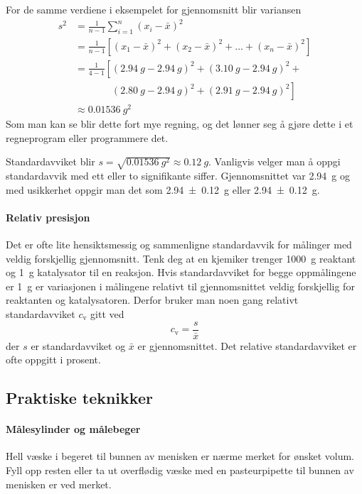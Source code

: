 \documentclass[hidelinks,12pt,norsk,a4paper,fleqn]{scrartcl}
\begin{document}
	
	For de samme verdiene i eksempelet for gjennomsnitt blir variansen
	\begin{align*}
		s^2 &= \frac{1}{n-1}\sum_{i=1}^{n}(x_i - \bar{x})^2 \\
		&=\frac{1}{n-1}\left[(x_1-\bar{x})^2 + (x_2-\bar{x})^2 + \dots + (x_n-\bar{x})^2\right]\\
		&=\frac{1}{4-1}\left[(\SI{2.94}{g}-\SI{2.94}{g})^2 + ( \SI{3.10}{g}-\SI{2.94}{g})^2\right. + \\
		&\phantom{=\frac{1}{4-1}\left[\right.}\left.  (\SI{2.80}{g}-\SI{2.94}{g})^2 + (\SI{2.91}{g}-\SI{2.94}{g})^2\right]\\
		&\approx \SI{0.01536}{g^2}
	\end{align*}
	Som man kan se blir dette fort mye regning, og det lønner seg å gjøre dette i et regneprogram eller programmere det.
	
	Standardavviket blir $s=\sqrt{\SI{0.01536}{g^2}}\approx\SI{0.12}{g}$. Vanligvis velger man å oppgi standardavvik med ett eller to signifikante siffer. Gjennomsnittet var \SI{2.94}{g} og med usikkerhet oppgir man det som \SI{2.94 +- 0.12}{g} eller \SI[separate-uncertainty=true]{2.94 +- 0.12}{g}.
	
	\paragraph{Relativ presisjon}
	Det er ofte lite hensiktsmessig og sammenligne standardavvik for målinger med veldig forskjellig gjennomsnitt. Tenk deg at en kjemiker trenger \SI{1000}{g} reaktant og \SI{1}{g} katalysator til en reaksjon. Hvis standardavviket for begge oppmålingene er \SI{1}{g} er variasjonen i målingene relativt til gjennomsnittet veldig forskjellig for reaktanten og katalysatoren. Derfor bruker man noen gang relativt standardavviket $c_\mathrm{v}$ gitt ved
	\begin{equation*}
		c_\mathrm{v}=\frac{s}{\bar{x}}
	\end{equation*}
	der $s$ er standardavviket og $\bar{x}$ er gjennomsnittet. Det relative standardavviket er ofte oppgitt i prosent.
		
	\subsection{Praktiske teknikker}
	
	\paragraph{Målesylinder og målebeger}
	Hell væske i begeret til bunnen av menisken er nærme merket for ønsket volum. Fyll opp resten eller ta ut overflødig væske med en pasteurpipette til bunnen av menisken er ved merket.
	
\end{document}

